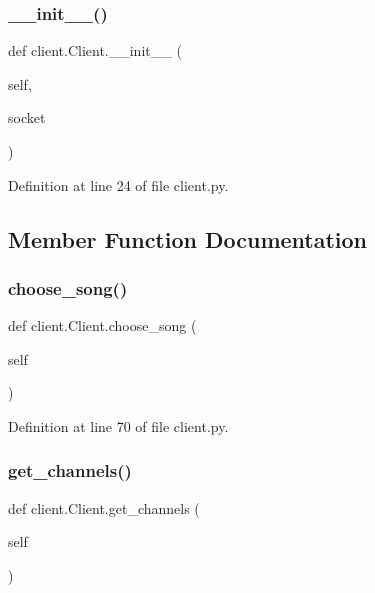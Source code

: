 \subsubsection{\texorpdfstring{\_\_init\_\_()}{\_\_init\_\_()}}
{\footnotesize\ttfamily def client.\+Client.\+\_\+\+\_\+init\+\_\+\+\_\+ (\begin{DoxyParamCaption}\item[{}]{self,  }\item[{}]{socket }\end{DoxyParamCaption})}



Definition at line 24 of file client.\+py.



\subsection{Member Function Documentation}
\mbox{\label{classclient_1_1_client_a3cd7973d42ff3ffa6fe61a078cd4ebdd}} 
\subsubsection{\texorpdfstring{choose\_song()}{choose\_song()}}
{\footnotesize\ttfamily def client.\+Client.\+choose\+\_\+song (\begin{DoxyParamCaption}\item[{}]{self }\end{DoxyParamCaption})}



Definition at line 70 of file client.\+py.

\mbox{\label{classclient_1_1_client_a1be4e39c0bb457fbdd4b01001c1fd2e0}} 
\subsubsection{\texorpdfstring{get\_channels()}{get\_channels()}}
{\footnotesize\ttfamily def client.\+Client.\+get\+\_\+channels (\begin{DoxyParamCaption}\item[{}]{self }\end{DoxyParamCaption})}




